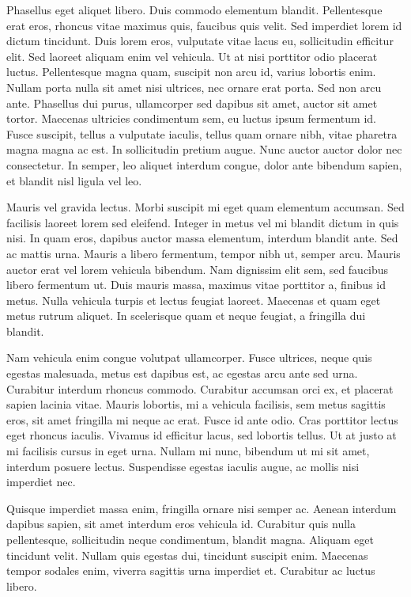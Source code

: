 \documentclass{article}
\begin{document}
Phasellus eget aliquet libero. Duis commodo elementum blandit. Pellentesque erat eros, rhoncus vitae maximus quis, faucibus quis velit. Sed imperdiet lorem id dictum tincidunt. Duis lorem eros, vulputate vitae lacus eu, sollicitudin efficitur elit. Sed laoreet aliquam enim vel vehicula. Ut at nisi porttitor odio placerat luctus. Pellentesque magna quam, suscipit non arcu id, varius lobortis enim. Nullam porta nulla sit amet nisi ultrices, nec ornare erat porta. Sed non arcu ante. Phasellus dui purus, ullamcorper sed dapibus sit amet, auctor sit amet tortor. Maecenas ultricies condimentum sem, eu luctus ipsum fermentum id. Fusce suscipit, tellus a vulputate iaculis, tellus quam ornare nibh, vitae pharetra magna magna ac est. In sollicitudin pretium augue. Nunc auctor auctor dolor nec consectetur. In semper, leo aliquet interdum congue, dolor ante bibendum sapien, et blandit nisl ligula vel leo.


Mauris vel gravida lectus. Morbi suscipit mi eget quam elementum accumsan. Sed facilisis laoreet lorem sed eleifend. Integer in metus vel mi blandit dictum in quis nisi. In quam eros, dapibus auctor massa elementum, interdum blandit ante. Sed ac mattis urna. Mauris a libero fermentum, tempor nibh ut, semper arcu. Mauris auctor erat vel lorem vehicula bibendum. Nam dignissim elit sem, sed faucibus libero fermentum ut. Duis mauris massa, maximus vitae porttitor a, finibus id metus. Nulla vehicula turpis et lectus feugiat laoreet. Maecenas et quam eget metus rutrum aliquet. In scelerisque quam et neque feugiat, a fringilla dui blandit.


Nam vehicula enim congue volutpat ullamcorper. Fusce ultrices, neque quis egestas malesuada, metus est dapibus est, ac egestas arcu ante sed urna. Curabitur interdum rhoncus commodo. Curabitur accumsan orci ex, et placerat sapien lacinia vitae. Mauris lobortis, mi a vehicula facilisis, sem metus sagittis eros, sit amet fringilla mi neque ac erat. Fusce id ante odio. Cras porttitor lectus eget rhoncus iaculis. Vivamus id efficitur lacus, sed lobortis tellus. Ut at justo at mi facilisis cursus in eget urna. Nullam mi nunc, bibendum ut mi sit amet, interdum posuere lectus. Suspendisse egestas iaculis augue, ac mollis nisi imperdiet nec.


Quisque imperdiet massa enim, fringilla ornare nisi semper ac. Aenean interdum dapibus sapien, sit amet interdum eros vehicula id. Curabitur quis nulla pellentesque, sollicitudin neque condimentum, blandit magna. Aliquam eget tincidunt velit. Nullam quis egestas dui, tincidunt suscipit enim. Maecenas tempor sodales enim, viverra sagittis urna imperdiet et. Curabitur ac luctus libero.
\end{document}
